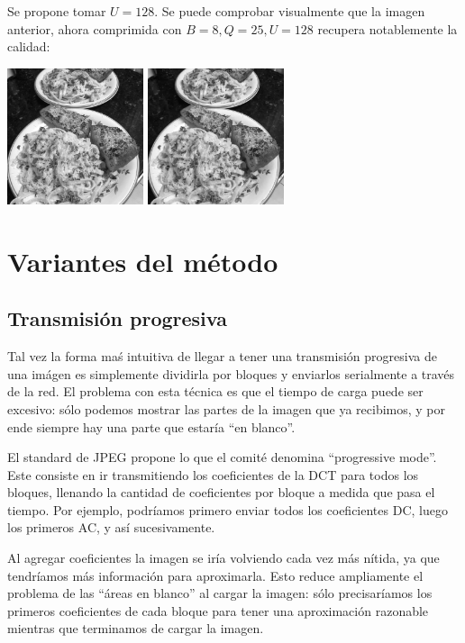 \documentclass{article}
\begin{document}
Se propone tomar $U = 128$.
Se puede comprobar visualmente que la imagen anterior,
ahora comprimida con $B = 8, Q = 25, U = 128$ recupera
notablemente la calidad:

\begin{center}
\includegraphics[width=4cm]{../imgs/input/imgs_gray/img07.png}
\includegraphics[width=4cm]{../imgs/output/gray_8_25_128/img07.png}
\end{center}

\section{Variantes del método}

\subsection{Transmisión progresiva}

Tal vez la forma maś intuitiva de llegar a tener una transmisión progresiva de una imágen es simplemente dividirla por bloques y enviarlos serialmente a través de la red. El problema con esta técnica es que el tiempo de carga puede ser excesivo: sólo podemos mostrar las partes de la imagen que ya recibimos, y por ende siempre hay una parte que estaría ``en blanco''.

El standard de JPEG propone lo que el comité denomina ``progressive mode''. Este consiste en ir transmitiendo los coeficientes de la DCT para todos los bloques, llenando la cantidad de coeficientes por bloque a medida que pasa el tiempo. Por ejemplo, podríamos primero enviar todos los coeficientes DC, luego los primeros AC, y así sucesivamente.

Al agregar coeficientes la imagen se iría volviendo cada vez más nítida, ya que tendríamos más información para aproximarla. Esto reduce ampliamente el problema de las ``áreas en blanco'' al cargar la imagen: sólo precisaríamos los primeros coeficientes de cada bloque para tener una aproximación razonable mientras que terminamos de cargar la imagen.
\end{document}
